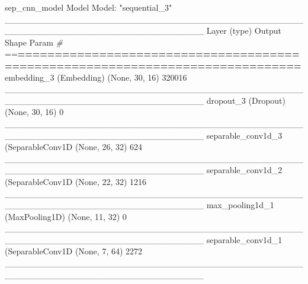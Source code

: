 \documentclass[
]{article}
\newenvironment{Shaded}{}{}
\newcommand{\CommentTok}[1]{\textcolor[rgb]{0.38,0.63,0.69}{\textit{#1}}}
\newcommand{\DecValTok}[1]{\textcolor[rgb]{0.25,0.63,0.44}{#1}}
\newcommand{\ErrorTok}[1]{\textcolor[rgb]{1.00,0.00,0.00}{\textbf{#1}}}
\newcommand{\FunctionTok}[1]{\textcolor[rgb]{0.02,0.16,0.49}{#1}}
\newcommand{\NormalTok}[1]{#1}
\newcommand{\SpecialCharTok}[1]{\textcolor[rgb]{0.25,0.44,0.63}{#1}}
\newcommand{\StringTok}[1]{\textcolor[rgb]{0.25,0.44,0.63}{#1}}
\begin{document}
\begin{Shaded}
\begin{Highlighting}[]
\NormalTok{sep\_cnn\_model}
\NormalTok{Model}
\NormalTok{Model}\SpecialCharTok{:} \StringTok{"sequential\_3"}
\NormalTok{\_\_\_\_\_\_\_\_\_\_\_\_\_\_\_\_\_\_\_\_\_\_\_\_\_\_\_\_\_\_\_\_\_\_\_\_\_\_\_\_\_\_\_\_\_\_\_\_\_\_\_\_\_\_\_\_\_\_\_\_\_\_\_\_\_\_\_\_\_\_\_\_\_\_\_\_\_\_\_\_}
\FunctionTok{Layer}\NormalTok{ (type)                        Output Shape                    Param }\CommentTok{\#     }
\SpecialCharTok{==}\ErrorTok{==============================================================================}
\FunctionTok{embedding\_3}\NormalTok{ (Embedding)             (None, }\DecValTok{30}\NormalTok{, }\DecValTok{16}\NormalTok{)                  }\DecValTok{320016}      
\NormalTok{\_\_\_\_\_\_\_\_\_\_\_\_\_\_\_\_\_\_\_\_\_\_\_\_\_\_\_\_\_\_\_\_\_\_\_\_\_\_\_\_\_\_\_\_\_\_\_\_\_\_\_\_\_\_\_\_\_\_\_\_\_\_\_\_\_\_\_\_\_\_\_\_\_\_\_\_\_\_\_\_}
\FunctionTok{dropout\_3}\NormalTok{ (Dropout)                 (None, }\DecValTok{30}\NormalTok{, }\DecValTok{16}\NormalTok{)                  }\DecValTok{0}           
\NormalTok{\_\_\_\_\_\_\_\_\_\_\_\_\_\_\_\_\_\_\_\_\_\_\_\_\_\_\_\_\_\_\_\_\_\_\_\_\_\_\_\_\_\_\_\_\_\_\_\_\_\_\_\_\_\_\_\_\_\_\_\_\_\_\_\_\_\_\_\_\_\_\_\_\_\_\_\_\_\_\_\_}
\FunctionTok{separable\_conv1d\_3}\NormalTok{ (}\FunctionTok{SeparableConv1D}\NormalTok{ (None, }\DecValTok{26}\NormalTok{, }\DecValTok{32}\NormalTok{)                  }\DecValTok{624}         
\NormalTok{\_\_\_\_\_\_\_\_\_\_\_\_\_\_\_\_\_\_\_\_\_\_\_\_\_\_\_\_\_\_\_\_\_\_\_\_\_\_\_\_\_\_\_\_\_\_\_\_\_\_\_\_\_\_\_\_\_\_\_\_\_\_\_\_\_\_\_\_\_\_\_\_\_\_\_\_\_\_\_\_}
\FunctionTok{separable\_conv1d\_2}\NormalTok{ (}\FunctionTok{SeparableConv1D}\NormalTok{ (None, }\DecValTok{22}\NormalTok{, }\DecValTok{32}\NormalTok{)                  }\DecValTok{1216}        
\NormalTok{\_\_\_\_\_\_\_\_\_\_\_\_\_\_\_\_\_\_\_\_\_\_\_\_\_\_\_\_\_\_\_\_\_\_\_\_\_\_\_\_\_\_\_\_\_\_\_\_\_\_\_\_\_\_\_\_\_\_\_\_\_\_\_\_\_\_\_\_\_\_\_\_\_\_\_\_\_\_\_\_}
\FunctionTok{max\_pooling1d\_1}\NormalTok{ (MaxPooling1D)      (None, }\DecValTok{11}\NormalTok{, }\DecValTok{32}\NormalTok{)                  }\DecValTok{0}           
\NormalTok{\_\_\_\_\_\_\_\_\_\_\_\_\_\_\_\_\_\_\_\_\_\_\_\_\_\_\_\_\_\_\_\_\_\_\_\_\_\_\_\_\_\_\_\_\_\_\_\_\_\_\_\_\_\_\_\_\_\_\_\_\_\_\_\_\_\_\_\_\_\_\_\_\_\_\_\_\_\_\_\_}
\FunctionTok{separable\_conv1d\_1}\NormalTok{ (}\FunctionTok{SeparableConv1D}\NormalTok{ (None, }\DecValTok{7}\NormalTok{, }\DecValTok{64}\NormalTok{)                   }\DecValTok{2272}        
\NormalTok{\_\_\_\_\_\_\_\_\_\_\_\_\_\_\_\_\_\_\_\_\_\_\_\_\_\_\_\_\_\_\_\_\_\_\_\_\_\_\_\_\_\_\_\_\_\_\_\_\_\_\_\_\_\_\_\_\_\_\_\_\_\_\_\_\_\_\_\_\_\_\_\_\_\_\_\_\_\_\_\_}

\end{Highlighting}
\end{Shaded}
\end{document}
